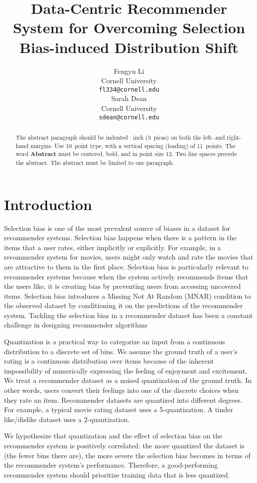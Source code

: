 \documentclass{article}
\title{Data-Centric Recommender System for Overcoming Selection Bias-induced Distribution Shift}
\author{%
  Fengyu Li \\
  Cornell University\\
  \texttt{fl334@cornell.edu} \\
  \And
  Sarah Dean \\
  Cornell University \\
  \texttt{sdean@cornell.edu} \\
}
\begin{document}
\maketitle


\begin{abstract}
  The abstract paragraph should be indented ~inch (3~picas) on
  both the left- and right-hand margins. Use 10~point type, with a vertical
  spacing (leading) of 11~points.  The word \textbf{Abstract} must be centered,
  bold, and in point size 12. Two line spaces precede the abstract. The abstract
  must be limited to one paragraph.
\end{abstract}

\section{Introduction}
Selection bias is one of the most prevalent source of biases in a dataset for recommender systems. Selection bias happens when there is a pattern in the items that a user rates, either implicitly or explicitly. For example, in a recommender system for movies, users might only watch and rate the movies that are attractive to them in the first place. Selection bias is particularly relevant to recommender systems because when the system actively recommends items that the users like, it is creating bias by preventing users from accessing uncovered items. Selection bias introduces a Missing Not At Random (MNAR) condition to the observed dataset by conditioning it on the predictions of the recommender system. Tackling the selection bias in a recommender dataset has been a constant challenge in designing recommender algorithms

Quantization is a practical way to categorize an input from a continuous distribution to a discrete set of bins. We assume the ground truth of a user's rating is a continuous distribution over items because of the inherent impossibility of numerically expressing the feeling of enjoyment and excitement. We treat a recommender dataset as a noised quantization of the ground truth. In other words, users convert their feelings into one of the discrete choices when they rate an item. Recommender datasets are quantized into different degrees. For example, a typical movie rating dataset uses a 5-quantization. A tinder like/dislike dataset uses a 2-quantization.

We hypothesize that quantization and the effect of selection bias on the recommender system is positively correlated: the more quantized the dataset is (the fewer bins there are), the more severe the selection bias becomes in terms of the recommender system's performance. Therefore, a good-performing recommender system should prioritize training data that is less quantized. 
\end{document}

